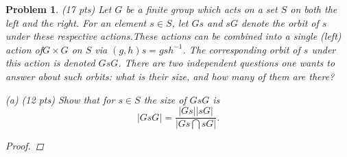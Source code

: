 \documentclass[11pt]{article}
\newcommand{\1}{\textbf{1}}
\newtheorem{prob}{Problem}
\begin{document}
\begin{prob}
(17 pts) Let $G$ be a finite group which acts on a set $S$ on both the left and the right. For an element $s \in S$, let $Gs$ and $sG$ denote the orbit of $s$ under these respective actions.These actions can be combined into a single (left) action of$G \times G$ on $S$ via $(g, h)s = gsh^{-1}$. The corresponding orbit of $s$ under this action is denoted $GsG$. There are two independent questions one wants to answer about such orbits: what is their size, and how many of them are there?

\noindent (a) (12 pts) Show that for $s\in S$ the size of $GsG$ is \[ | GsG| = \frac{|Gs||sG|}{|Gs\bigcap sG|}.\]

\begin{proof}

\end{proof}
\end{prob}
\end{document}
